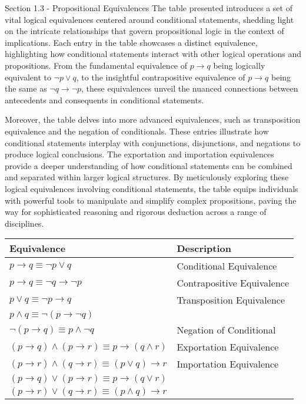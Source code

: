 \begin{notes}{Section 1.3 - Propositional Equivalences}
    The table presented introduces a set of vital logical equivalences centered around conditional statements, shedding light on the intricate relationships that govern propositional logic in the context of implications. 
    Each entry in the table showcases a distinct equivalence, highlighting how conditional statements interact with other logical operations and propositions. From the fundamental equivalence of $p \rightarrow q$ being 
    logically equivalent to $\neg p \lor q$, to the insightful contrapositive equivalence of $p \rightarrow q$ being the same as $\neg q \rightarrow \neg p$, these equivalences unveil the nuanced connections between 
    antecedents and consequents in conditional statements.

    Moreover, the table delves into more advanced equivalences, such as transposition equivalence and the negation of conditionals. These entries illustrate how conditional statements interplay with conjunctions, disjunctions, 
    and negations to produce logical conclusions. The exportation and importation equivalences provide a deeper understanding of how conditional statements can be combined and separated within larger logical structures. By 
    meticulously exploring these logical equivalences involving conditional statements, the table equips individuals with powerful tools to manipulate and simplify complex propositions, paving the way for sophisticated reasoning 
    and rigorous deduction across a range of disciplines.
    \begin{center}
        \begin{tabular}{|l|l|}
        \hline Equivalence & Description \\ \hline
        $p \rightarrow q \equiv \neg p \lor q$ & Conditional Equivalence \\
        $p \rightarrow q \equiv \neg q \rightarrow \neg p$ & Contrapositive Equivalence \\
        $p \lor q \equiv \neg p \rightarrow q$ & Transposition Equivalence \\
        $p \land q \equiv \neg (p \rightarrow \neg q)$ & \\
        $\neg (p \rightarrow q) \equiv p \land \neg q$ & Negation of Conditional \\
        $(p \rightarrow q) \land (p \rightarrow r) \equiv p \rightarrow (q \land r)$ & Exportation Equivalence \\
        $(p \rightarrow r) \land (q \rightarrow r) \equiv (p \lor q) \rightarrow r$ & Importation Equivalence \\
        $(p \rightarrow q) \lor (p \rightarrow r) \equiv p \rightarrow (q \lor r)$ & \\
        $(p \rightarrow r) \lor (q \rightarrow r) \equiv (p \land q) \rightarrow r$ & \\ \hline
        \end{tabular}
    \end{center}


\end{notes}
